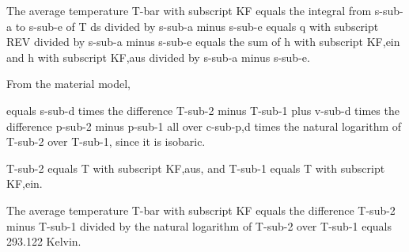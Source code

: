 The average temperature T-bar with subscript KF equals the integral from s-sub-a to s-sub-e of T ds divided by s-sub-a minus s-sub-e equals q with subscript REV divided by s-sub-a minus s-sub-e equals the sum of h with subscript KF,ein and h with subscript KF,aus divided by s-sub-a minus s-sub-e.

From the material model,

equals s-sub-d times the difference T-sub-2 minus T-sub-1 plus v-sub-d times the difference p-sub-2 minus p-sub-1 all over c-sub-p,d times the natural logarithm of T-sub-2 over T-sub-1, since it is isobaric.

T-sub-2 equals T with subscript KF,aus, and T-sub-1 equals T with subscript KF,ein.

The average temperature T-bar with subscript KF equals the difference T-sub-2 minus T-sub-1 divided by the natural logarithm of T-sub-2 over T-sub-1 equals 293.122 Kelvin.
